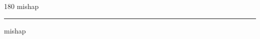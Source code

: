 
\begin{frame}
\begin{center}
\begin{turn}{180}
{\fontsize{2.5cm}{1em}\selectfont mishap}
\end{turn}
\vspace{1em}\par  
\hrule
\vspace{1em}\par  
{\fontsize{2.5cm}{1em}\selectfont mishap}
\end{center}
\end{frame}
